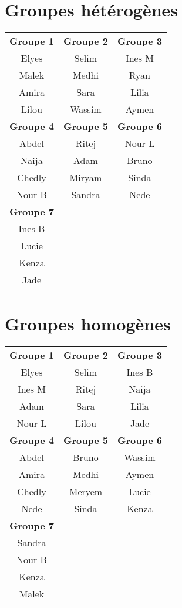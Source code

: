 \documentclass[10pt]{article}
\begin{document}
 

\section{Groupes hétérogènes} 
 
\begin{tabular}{|c|c|c|}
\hline 
\textbf{Groupe 1}  & \textbf{Groupe 2}  & \textbf{Groupe 3}  \\ 
 Elyes & Selim & Ines M\\ 
 Malek & Medhi & Ryan \\ 
 Amira & Sara  & Lilia \\ 
 Lilou & Wassim& Aymen \\ 
\hline 
\textbf{Groupe 4} & \textbf{Groupe 5}  & \textbf{Groupe 6} \\ 
Abdel & Ritej & Nour L \\ 
Naija & Adam  & Bruno \\ 
Chedly & Miryam & Sinda \\ 
Nour B & Sandra & Nede \\ 
\hline 
\textbf{Groupe 7} &   &   \\
Ines B &   &   \\ 
Lucie &   &   \\ 
Kenza &   &   \\ 
Jade &   &   \\ 
\hline
\end{tabular} 

 
\section{Groupes homogènes} 
 
\begin{tabular}{|c|c|c|}
\hline 
\textbf{Groupe 1}  & \textbf{Groupe 2}  & \textbf{Groupe 3}  \\ 
 Elyes  & Selim & Ines B\\ 
 Ines M & Ritej & Naija \\ 
 Adam   & Sara  & Lilia \\ 
 Nour L & Lilou & Jade \\ 
\hline 
\textbf{Groupe 4} & \textbf{Groupe 5}  & \textbf{Groupe 6} \\ 
Abdel  & Bruno & Wassim \\ 
Amira  & Medhi  & Aymen \\ 
Chedly & Meryem & Lucie \\ 
Nede  & Sinda & Kenza \\ 
\hline 
\textbf{Groupe 7} &   &   \\
Sandra &   &   \\ 
Nour B &   &   \\ 
Kenza &   &   \\ 
Malek &   &   \\ 
\hline
\end{tabular} 


 
\end{document}
